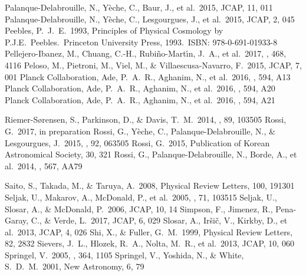 \documentclass{emulateapj}
\begin{document}
\begin{thebibliography}{}
 Palanque-Delabrouille, N., Y{\`e}che, C., Baur, J., et al.\ 2015, JCAP, 11, 011
 Palanque-Delabrouille, N., Y{\`e}che, C., Lesgourgues, J., et al.\ 2015, JCAP, 2, 045 
 Peebles, P.~J.~E.\ 1993, Principles of Physical Cosmology by P.J.E.~Peebles.~Princeton University Press, 1993.~ISBN: 978-0-691-01933-8
 Pellejero-Ibanez, M., Chuang, C.-H., Rubi{\~n}o-Mart{\'{\i}}n, J.~A., et al.\ 2017, \mnras, 468, 4116 
 Peloso, M., Pietroni, M., Viel, M., \& Villaescusa-Navarro, F.\ 2015, JCAP, 7, 001 
 Planck Collaboration, Ade, P.~A.~R., Aghanim, N., et al.\ 2016, \aap, 594, A13 
 Planck Collaboration, Ade, P.~A.~R., Aghanim, N., et al.\ 2016, \aap, 594, A20 
 Planck Collaboration, Ade, P.~A.~R., Aghanim, N., et al.\ 2016, \aap, 594, A21 


 Riemer-S{\o}rensen, S., Parkinson, D., \& Davis, T.~M.\ 2014, \prd, 89, 103505 
 Rossi, G.\ 2017, in preparation 
 Rossi, G., Y{\`e}che, C., Palanque-Delabrouille, N., \& Lesgourgues, J.\ 2015, \prd, 92, 063505
 Rossi, G.\ 2015, Publication of Korean Astronomical Society, 30, 321 
 Rossi, G., Palanque-Delabrouille, N., Borde, A., et al.\ 2014, \aap, 567, AA79


 Saito, S., Takada, M., \& Taruya, A.\ 2008, Physical Review Letters, 100, 191301 
 Seljak, U., Makarov, A., McDonald, P., et al.\ 2005, \prd, 71, 103515 
 Seljak, U., Slosar, A., \& McDonald, P.\ 2006, JCAP, 10, 14
 Simpson, F., Jimenez, R., Pena-Garay, C., \& Verde, L.\ 2017, JCAP, 6, 029
 Slosar, A., Ir{\v s}i{\v c}, V., Kirkby, D., et al.\ 2013, JCAP, 4, 026
 Shi, X., \& Fuller, G.~M.\ 1999, Physical Review Letters, 82, 2832 
 Sievers, J.~L., Hlozek, R.~A., Nolta, M.~R., et al.\ 2013, JCAP, 10, 060 
 Springel, V.\ 2005, \mnras, 364, 1105
 Springel, V., Yoshida, N., \& White, S.~D.~M.\ 2001, New Astronomy, 6, 79



\end{thebibliography}
\end{document}
